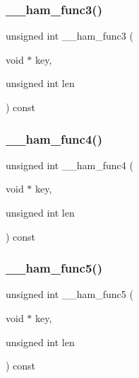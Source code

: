\subsubsection{\texorpdfstring{\_\_ham\_func3()}{\_\_ham\_func3()}}
{\footnotesize\ttfamily unsigned int \+\_\+\+\_\+ham\+\_\+func3 (\begin{DoxyParamCaption}\item[{void $\ast$}]{key,  }\item[{unsigned int}]{len }\end{DoxyParamCaption}) const}

\mbox{\label{adat-devel_2other__libs_2filedb_2filehash_2ffdb__hash__func_8c_aae91cb0e3178660d77a99210d619cbef}} 
\subsubsection{\texorpdfstring{\_\_ham\_func4()}{\_\_ham\_func4()}}
{\footnotesize\ttfamily unsigned int \+\_\+\+\_\+ham\+\_\+func4 (\begin{DoxyParamCaption}\item[{void $\ast$}]{key,  }\item[{unsigned int}]{len }\end{DoxyParamCaption}) const}

\mbox{\label{adat-devel_2other__libs_2filedb_2filehash_2ffdb__hash__func_8c_a4e4944a1d277ba37eaa423ed3b33a589}} 
\subsubsection{\texorpdfstring{\_\_ham\_func5()}{\_\_ham\_func5()}}
{\footnotesize\ttfamily unsigned int \+\_\+\+\_\+ham\+\_\+func5 (\begin{DoxyParamCaption}\item[{void $\ast$}]{key,  }\item[{unsigned int}]{len }\end{DoxyParamCaption}) const}

\mbox{\label{adat-devel_2other__libs_2filedb_2filehash_2ffdb__hash__func_8c_a28296443e94e96a75b642a74b3709511}} 

